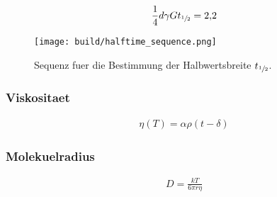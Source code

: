 \begin{align}
  \label{eq:halbwertszeit}
  \frac{1}{4} d \gamma G t_{\sfrac{1}{2}} = \num{2.2}
\end{align}

\begin{figure}[ht]
  \centering
  \texttt{[image: build/halftime\_sequence.png]}
  \caption{Sequenz fuer die Bestimmung der Halbwertsbreite $t_{\sfrac{1}{2}}$.}%
  \label{fig:build/halftime_sequence}
\end{figure}

\subsubsection{Viskositaet}%
\label{sub:viskositaet}

\begin{align}
  \label{eq:viskositaet}
  \eta \left(T\right) = \alpha \rho \left(t - \delta\right)
\end{align}

\subsubsection{Molekuelradius}%
\label{sub:molekuelradius}

\begin{align}
  \label{eq:molekuelradius}
  D = \frac{k T}{6 \pi r \eta}
\end{align}




